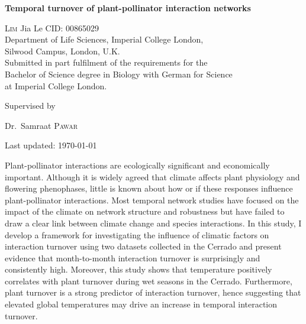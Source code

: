 \documentclass[11pt]{article}
\renewenvironment{abstract}
 {\hspace{.8cm}
  {\bfseries\huge\abstractname}
  \list{}{
    \setlength{\leftmargin}{.95cm}%
    \setlength{\rightmargin}{\leftmargin}%
  }%
  \item\relax}
 {\endlist}
\begin{document}
\begin{titlepage}
	\centering
	\vspace*{\fill}
	{\huge\bfseries Temporal turnover of plant-pollinator interaction networks \par}
	\vspace{2cm}
	{\Large \textsc{Lim} Jia Le  {    }  CID: 00865029}
	\\ 	\vspace{0.5cm}
	{Department of Life Sciences, Imperial College London, \\Silwood Campus, London, U.K.} \\ \vspace{0.5cm}
	{Submitted in part fulfilment of the requirements for the \\ Bachelor of Science degree in Biology with German for Science \\ at Imperial College London.} \\
	\vspace*{\fill}
	{\large Supervised by\par
	Dr.~Samraat \textsc{Pawar}}
	\vfill
	{\large Last updated: \today\par}
\end{titlepage}

\newpage
{}
\vspace*{\fill}
\begin{abstract}  %
\vspace{1.5cm}
\doublespacing
Plant-pollinator interactions are ecologically significant and economically important. Although it is widely agreed that climate affects plant physiology and flowering phenophases, little is known about how or if these responses influence plant-pollinator interactions. Most temporal network studies have focused on the impact of the climate on network structure and robustness but have failed to draw a clear link between climate change and species interactions. In this study, I develop a framework for investigating the influence of climatic factors on interaction turnover using two datasets collected in the Cerrado and present evidence that month-to-month interaction turnover is surprisingly and consistently high. Moreover, this study shows that temperature positively correlates with plant turnover during wet seasons in the Cerrado. Furthermore, plant turnover is a strong predictor of interaction turnover, hence suggesting that elevated global temperatures may drive an increase in temporal interaction turnover. 
\end{abstract}
\vfill
\end{document}
